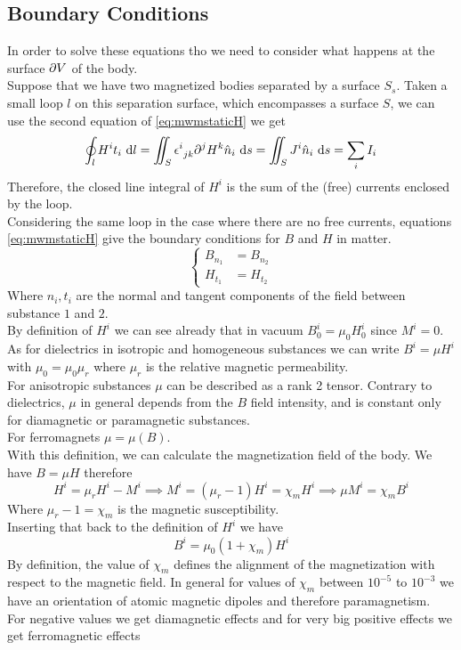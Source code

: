 \documentclass[../electromagnetism.tex]{subfiles}
\begin{document}
\subsection{Boundary Conditions}
In order to solve these equations tho we need to consider what happens at the surface $\partial V$ of the body.\\
Suppose that we have two magnetized bodies separated by a surface $S_s$. Taken a small loop $l$ on this separation surface, which encompasses a surface $S$, we can use the second equation of \eqref{eq:mwmstaticH} we get
\begin{equation}
	\oint_lH^it_i\ \mathrm{d} l=\iint_S\epsilon^{i}_{\ jk}\partial^jH^k\hat{n}_i\ \mathrm{d} s=\iint_SJ^i\hat{n}_i\ \mathrm{d} s=\sum_iI_i
	\label{eq:sumofcurrents}
\end{equation}
Therefore, the closed line integral of $H^i$ is the sum of the (free) currents enclosed by the loop.\\
Considering the same loop in the case where there are no free currents, equations \eqref{eq:mwmstaticH} give the boundary conditions for $B$ and $H$ in matter.\\
\begin{equation}
	\left\{ \begin{aligned}
			B_{n_1}&=B_{n_2}\\
			H_{t_1}&=H_{t_2}
	\end{aligned}\right.
	\label{eq:boundcbh}
\end{equation}
Where $n_i,t_i$ are the normal and tangent components of the field between substance $1$ and $2$.\\
By definition of $H^i$ we can see already that in vacuum $B_0^i=\mu_0H^i_0$ since $M^i=0$. As for dielectrics in isotropic and homogeneous substances we can write $B^i=\mu H^i$ with $\mu_0=\mu_0\mu_r$ where $\mu_r$ is the relative magnetic permeability.\\
For anisotropic substances $\mu$ can be described as a rank 2 tensor. Contrary to dielectrics, $\mu$ in general depends from the $B$ field intensity, and is constant only for diamagnetic or paramagnetic substances.\\
For ferromagnets $\mu=\mu(B)$.\\
With this definition, we can calculate the magnetization field of the body. We have $B=\mu H$ therefore
\begin{equation}
	H^i=\mu_rH^i-M^i\implies M^i=(\mu_r-1)H^i=\chi_mH^i\implies\mu M^i=\chi_mB^i
	\label{eq:magneticsus}
\end{equation}
Where $\mu_r-1=\chi_m$ is the magnetic susceptibility.\\
Inserting that back to the definition of $H^i$ we have
\begin{equation}
	B^i=\mu_0\left( 1+\chi_m \right)H^i
	\label{eq:magsusbh}
\end{equation}
By definition, the value of $\chi_m$ defines the alignment of the magnetization with respect to the magnetic field. In general for values of $\chi_m$ between $10^{-5}$ to $10^{-3}$ we have an orientation of atomic magnetic dipoles and therefore paramagnetism.\\
For negative values we get diamagnetic effects and for very big positive effects we get ferromagnetic effects
\end{document}
